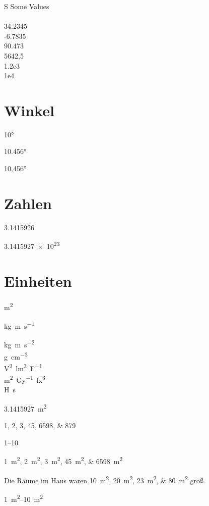 \documentclass[12pt,ngerman,parskip=half]{scrartcl}
\begin{document}
\begin{table}
\caption{Standardverhalten des  \texttt{S} Spaltentyps}
\centering
\begin{tabular}{S}
\toprule
{Some Values} \\
 \\
34.2345 \\
-6.7835 \\
90.473 \\
5642,5 \\
1.2e3 \\
1e4 \\
\bottomrule
\end{tabular}
\end{table}

\section{Winkel}

\ang{10}

\ang{10.456}

\ang{10,456}


\section{Zahlen}

\num{3,1415926}

\num{3.1415927e23}

\section{Einheiten}

\si{m^2}

\si{kg.m.s^{-1}}

\si{\kilo\gram\metre\per\square\second} \\
\si{\gram\per\cubic\centi\metre} \\
\si{\square\volt\cubic\lumen\per\farad} \\
\si{\metre\squared\per\gray\cubic\lux} \\
\si{\henry\second}

\SI{3.1415927}{m^2}

\numlist{1;2;3;45;6598; 879}

\numrange{1}{10}

\SIlist{1;2;3;45;6598}{m^2}

Die Räume im Haus waren \SIlist{10;20;23;80}{m^2} groß.

\SIrange{1}{10}{m^2}
\end{document}

